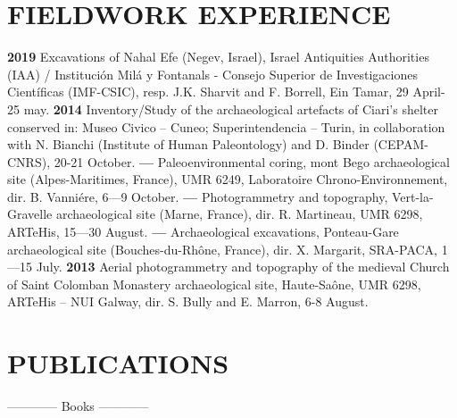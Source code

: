 \documentclass[11pt]{report} %
\begin{document}
\section*{FIELDWORK EXPERIENCE}

\textbf{2019 }Excavations of Nahal Efe (Negev, Israel), Israel Antiquities Authorities (IAA) / Instituci\'{o}n Mil\'{a} y Fontanals - Consejo Superior de Investigaciones Cient\'{i}ficas (IMF-CSIC), resp. J.K. Sharvit and F. Borrell, Ein Tamar, 29 April-25 may.
\smallbreak
\textbf{2014 }Inventory/Study of the archaeological artefacts of Ciari's shelter conserved in: Museo Civico -- Cuneo; Superintendencia -- Turin, in collaboration with N. Bianchi (Institute of Human Paleontology) and D. Binder (CEPAM-CNRS), 20-21 October.
\smallbreak
\textbf{---  }Paleoenvironmental coring, mont Bego archaeological site (Alpes-Maritimes, France), UMR 6249, Laboratoire Chrono-Environnement, dir. B. Vanni\'{e}re, 6---9 October.
\smallbreak
\textbf{---  }Photogrammetry and topography, Vert-la-Gravelle archaeological site (Marne, France), dir. R. Martineau, UMR 6298, ARTeHis, 15---30 August.
\smallbreak
\textbf{---  }Archaeological excavations, Ponteau-Gare archaeological site (Bouches-du-Rh\^{o}ne, France), dir. X. Margarit, SRA-PACA, 1---15 July.\smallbreak
\textbf{2013 }Aerial\textbf{ }photogrammetry and topography of the medieval Church of Saint Colomban Monastery archaeological site, Haute-Sa\^{o}ne, UMR 6298, ARTeHis -- NUI Galway, dir. S. Bully and E. Marron, 6-8 August.

\section*{PUBLICATIONS}

\begin{center}------------ Books ------------ \end{center}
\end{document}
